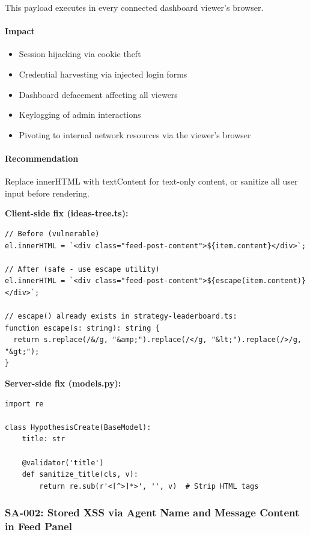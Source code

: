 \documentclass[twocolumn,10pt,letterpaper]{article}
\begin{document}
This payload executes in every connected dashboard viewer's browser.


\paragraph{Impact}

\begin{itemize}
\setlength{\itemsep}{0pt}
\setlength{\parskip}{0pt}
  \item Session hijacking via cookie theft
  \item Credential harvesting via injected login forms
  \item Dashboard defacement affecting all viewers
  \item Keylogging of admin interactions
  \item Pivoting to internal network resources via the viewer's browser
\end{itemize}

\paragraph{Recommendation}

Replace innerHTML with textContent for text-only content, or sanitize all user input before rendering.


\textbf{Client-side fix (ideas-tree.ts):}


\begin{lstlisting}
// Before (vulnerable)
el.innerHTML = `<div class="feed-post-content">${item.content}</div>`;

// After (safe - use escape utility)
el.innerHTML = `<div class="feed-post-content">${escape(item.content)}</div>`;

// escape() already exists in strategy-leaderboard.ts:
function escape(s: string): string {
  return s.replace(/&/g, "&amp;").replace(/</g, "&lt;").replace(/>/g, "&gt;");
}
\end{lstlisting}

\textbf{Server-side fix (models.py):}


\begin{lstlisting}
import re

class HypothesisCreate(BaseModel):
    title: str

    @validator('title')
    def sanitize_title(cls, v):
        return re.sub(r'<[^>]*>', '', v)  # Strip HTML tags
\end{lstlisting}

\subsubsection{SA-002: Stored XSS via Agent Name and Message Content in Feed Panel}
\end{document}
